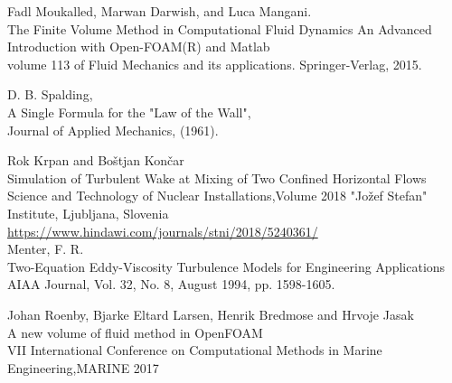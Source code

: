 \documentclass[a4paper, 12pt]{report}
\begin{document}
\begin{thebibliography}{9}
	Fadl Moukalled, Marwan Darwish, and Luca Mangani.\\
	The Finite Volume Method in Computational Fluid Dynamics An Advanced Introduction with 	Open-FOAM(R) and Matlab\\
	volume 113 of Fluid Mechanics and its applications. Springer-Verlag, 2015.
	
	D. B. Spalding,\\
	A Single Formula for the "Law of the Wall",\\ 
	Journal of Applied Mechanics, (1961).
	
	Rok Krpan and Boštjan Končar\\
	Simulation of Turbulent Wake at Mixing of Two Confined Horizontal Flows
	Science and Technology of Nuclear Installations,Volume 2018 "Jožef Stefan" Institute, 		Ljubljana, Slovenia
	\url{https://www.hindawi.com/journals/stni/2018/5240361/}\\
	
	Menter, F. R.\\
	Two-Equation Eddy-Viscosity Turbulence Models for Engineering Applications\\
	AIAA Journal, Vol. 32, No. 8, August 1994, pp. 1598-1605.
	
	Johan Roenby, Bjarke Eltard Larsen, Henrik Bredmose and Hrvoje Jasak\\
	A new volume of fluid method in OpenFOAM\\
	VII International Conference on Computational Methods in Marine Engineering,MARINE 			2017
	
\end{thebibliography}
\end{document}
